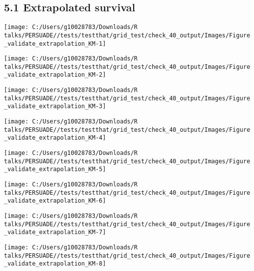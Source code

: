\documentclass[
]{article}
\begin{document}
\subsection{5.1 Extrapolated survival}\label{extrapolated-survival}

\begin{flushleft}\texttt{[image: C:/Users/g10028783/Downloads/R talks/PERSUADE//tests/testthat/grid\_test/check\_40\_output/Images/Figure\_validate\_extrapolation\_KM-1]} \end{flushleft}

\begin{flushleft}\texttt{[image: C:/Users/g10028783/Downloads/R talks/PERSUADE//tests/testthat/grid\_test/check\_40\_output/Images/Figure\_validate\_extrapolation\_KM-2]} \end{flushleft}

\begin{flushleft}\texttt{[image: C:/Users/g10028783/Downloads/R talks/PERSUADE//tests/testthat/grid\_test/check\_40\_output/Images/Figure\_validate\_extrapolation\_KM-3]} \end{flushleft}

\begin{flushleft}\texttt{[image: C:/Users/g10028783/Downloads/R talks/PERSUADE//tests/testthat/grid\_test/check\_40\_output/Images/Figure\_validate\_extrapolation\_KM-4]} \end{flushleft}

\begin{flushleft}\texttt{[image: C:/Users/g10028783/Downloads/R talks/PERSUADE//tests/testthat/grid\_test/check\_40\_output/Images/Figure\_validate\_extrapolation\_KM-5]} \end{flushleft}

\begin{flushleft}\texttt{[image: C:/Users/g10028783/Downloads/R talks/PERSUADE//tests/testthat/grid\_test/check\_40\_output/Images/Figure\_validate\_extrapolation\_KM-6]} \end{flushleft}

\begin{flushleft}\texttt{[image: C:/Users/g10028783/Downloads/R talks/PERSUADE//tests/testthat/grid\_test/check\_40\_output/Images/Figure\_validate\_extrapolation\_KM-7]} \end{flushleft}

\begin{flushleft}\texttt{[image: C:/Users/g10028783/Downloads/R talks/PERSUADE//tests/testthat/grid\_test/check\_40\_output/Images/Figure\_validate\_extrapolation\_KM-8]} \end{flushleft}
\end{document}
